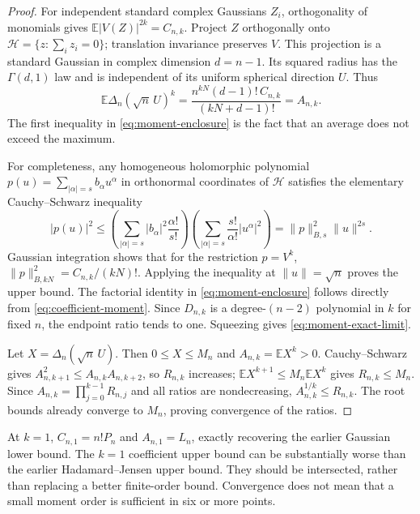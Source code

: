 \documentclass[11pt]{article}
\theoremstyle{remark}
\numberwithin{equation}{section}
\begin{document}
\begin{proof}
For independent standard complex Gaussians $Z_i$, orthogonality of
monomials gives $\mathbb E|V(Z)|^{2k}=C_{n,k}$.
Project $Z$ orthogonally onto
$\mathcal H=\{z:\sum_i z_i=0\}$; translation invariance preserves
$V$. This projection is a standard Gaussian in complex dimension
$d=n-1$. Its squared radius has the $\Gamma(d,1)$ law and is
independent of its uniform spherical direction $U$. Thus
\[
 \mathbb E\Delta_n(\sqrt n\,U)^k
 =\frac{n^{kN}(d-1)!\,C_{n,k}}{(kN+d-1)!}=A_{n,k}.
\]
The first inequality in \eqref{eq:moment-enclosure} is the fact
that an average does not exceed the maximum.

For completeness, any homogeneous holomorphic polynomial
$p(u)=\sum_{|\alpha|=s}b_\alpha u^\alpha$ in orthonormal coordinates
of $\mathcal H$ satisfies the elementary Cauchy--Schwarz inequality
\[
 |p(u)|^2\le
 \left(\sum_{|\alpha|=s}|b_\alpha|^2\frac{\alpha!}{s!}\right)
 \left(\sum_{|\alpha|=s}\frac{s!}{\alpha!}|u^\alpha|^2\right)
 =\|p\|_{B,s}^2\|u\|^{2s}.
\]
Gaussian integration shows that for the restriction $p=V^k$,
$\|p\|_{B,kN}^2=C_{n,k}/(kN)!$. Applying the inequality at
$\|u\|=\sqrt n$ proves the upper bound. The factorial identity
in \eqref{eq:moment-enclosure} follows directly from
\eqref{eq:coefficient-moment}.
Since $D_{n,k}$ is a degree-$(n-2)$ polynomial in $k$ for fixed $n$,
the endpoint ratio tends to one. Squeezing gives
\eqref{eq:moment-exact-limit}.

Let $X=\Delta_n(\sqrt n\,U)$. Then $0\le X\le M_n$ and
$A_{n,k}=\mathbb E X^k>0$. Cauchy--Schwarz gives
$A_{n,k+1}^2\le A_{n,k}A_{n,k+2}$, so $R_{n,k}$ increases;
$\mathbb E X^{k+1}\le M_n\mathbb E X^k$ gives $R_{n,k}\le M_n$.
Since $A_{n,k}=\prod_{j=0}^{k-1}R_{n,j}$ and all ratios are
nondecreasing, $A_{n,k}^{1/k}\le R_{n,k}$. The root bounds already
converge to $M_n$, proving convergence of the ratios.
\end{proof}

At $k=1$, $C_{n,1}=n!P_n$ and $A_{n,1}=L_n$, exactly recovering
the earlier Gaussian lower bound. The $k=1$ coefficient upper bound
can be substantially worse than the earlier Hadamard--Jensen upper
bound. They should be intersected, rather than replacing a better
finite-order bound. Convergence does not mean that a small moment
order is sufficient in six or more points.

\end{document}
